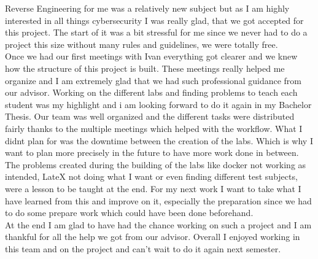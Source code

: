 Reverse Engineering for me was a relatively new subject but as I am highly interested in all things cybersecurity I was really glad, that we got accepted for this project. 
The start of it was a bit stressful for me since we never had to do a project this size without many rules and guidelines, we were totally free. \\
Once we had our first meetings with Ivan everything got clearer and we knew how the structure of this project is built. 
These meetings really helped me organize and I am extremely glad that we had such professional guidance from our advisor. 
Working on the different labs and finding problems to teach each student was my highlight and i am looking forward to do it again in my Bachelor Thesis. 
Our team was well organized and the different tasks were distributed fairly thanks to the multiple meetings which helped with the workflow.  
What I didnt plan for was the downtime between the creation of the labs. Which is why I want to plan more precisely in the future to have more work done in between.
The problems created during the building of the labs like docker not working as intended, LateX not doing what I want or even finding different test subjects, were a lesson to be taught at the end. 
For my next work I want to take what I have learned from this and improve on it, especially the preparation since we had to do some prepare work which could have been done beforehand. \\
At the end I am glad to have had the chance working on such a project and I am thankful for all the help we got from our advisor. 
Overall I enjoyed working in this team and on the project and can't wait to do it again next semester.
